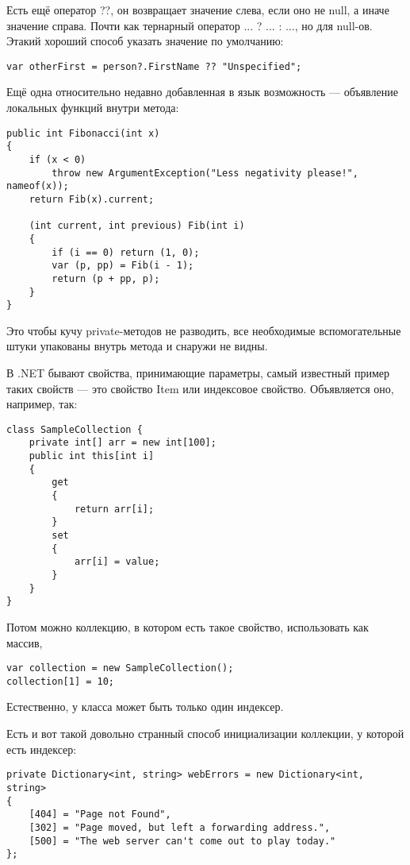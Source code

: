 \documentclass[a5paper]{article}
\begin{document}
Есть ещё оператор ??, он возвращает значение слева, если оно не null, а иначе значение справа. Почти как тернарный оператор ... ? ... : ..., но для null-ов. Этакий хороший способ указать значение по умолчанию:

\begin{verbatim}
var otherFirst = person?.FirstName ?? "Unspecified";
\end{verbatim}

Ещё одна относительно недавно добавленная в язык возможность --- объявление локальных функций внутри метода:

\begin{verbatim}
public int Fibonacci(int x)
{
    if (x < 0) 
        throw new ArgumentException("Less negativity please!", nameof(x));
    return Fib(x).current;

    (int current, int previous) Fib(int i)
    {
        if (i == 0) return (1, 0);
        var (p, pp) = Fib(i - 1);
        return (p + pp, p);
    }
}
\end{verbatim}

Это чтобы кучу private-методов не разводить, все необходимые вспомогательные штуки упакованы внутрь метода и снаружи не видны.

В .NET бывают свойства, принимающие параметры, самый известный пример таких свойств --- это свойство Item или индексовое свойство. Объявляется оно, например, так: 

\begin{verbatim}
class SampleCollection {
    private int[] arr = new int[100];
    public int this[int i]
    {
        get
        {
            return arr[i];
        }
        set
        {
            arr[i] = value;
        }
    }
}
\end{verbatim}

Потом можно коллекцию, в котором есть такое свойство, использовать как массив,

\begin{verbatim}
var collection = new SampleCollection();
collection[1] = 10;
\end{verbatim}

Естественно, у класса может быть только один индексер.

Есть и вот такой довольно странный способ инициализации коллекции, у которой есть индексер:

\begin{verbatim}
private Dictionary<int, string> webErrors = new Dictionary<int, string>
{
    [404] = "Page not Found",
    [302] = "Page moved, but left a forwarding address.",
    [500] = "The web server can't come out to play today."
};
\end{verbatim}
\end{document}

